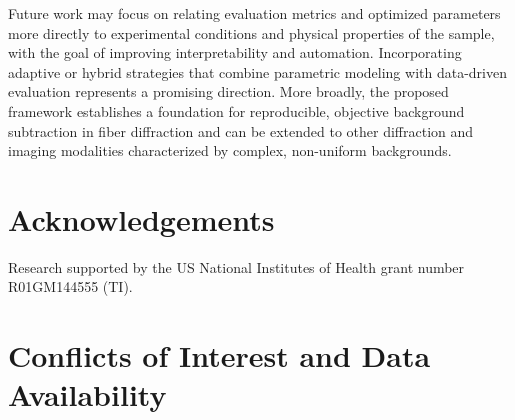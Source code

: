 \documentclass[iucr,review]{iucrjournals}
\begin{document}
Future work may focus on relating evaluation metrics and optimized parameters more directly to experimental conditions and physical properties of the sample, with the goal of improving interpretability and automation. Incorporating adaptive or hybrid strategies that combine parametric modeling with data-driven evaluation represents a promising direction. More broadly, the proposed framework establishes a foundation for reproducible, objective background subtraction in fiber diffraction and can be extended to other diffraction and imaging modalities characterized by complex, non-uniform backgrounds.










\section*{Acknowledgements}
Research supported by the US National Institutes of Health grant number R01GM144555 (TI).

\section*{Conflicts of Interest and Data Availability} 





\appendix

\end{document}
